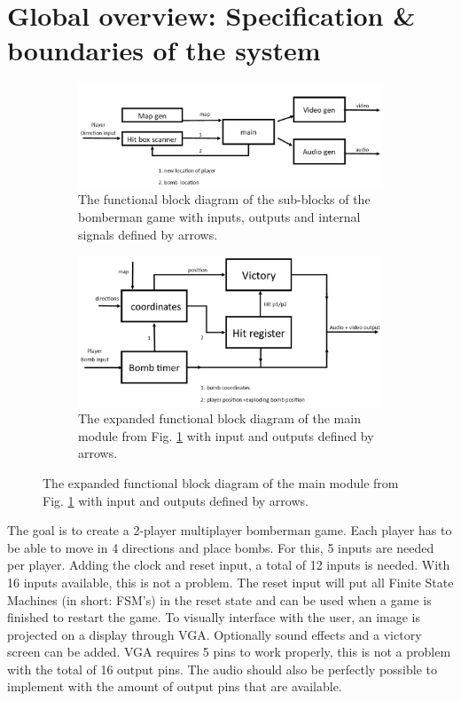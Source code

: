 \section{Global overview: Specification \& boundaries of the system}
\begin{figure}[H]
\begin{subfigure}{.5\textwidth}
    \centering
    \includegraphics[width=1\linewidth]{Figures/function_block_diagram.jpg}
    \caption{The functional block diagram of the sub-blocks of the bomberman game with inputs, outputs and internal signals defined by arrows.}
    \label{fig:blockdiagram}
    \end{subfigure}%
    \begin{subfigure}{.5\textwidth}
    \centering
    \includegraphics[width=1\linewidth]{Figures/main_block.jpg}
    \caption{The expanded functional block diagram of the main module from Fig. \ref{fig:blockdiagram} with input and outputs defined by arrows.}
    \label{fig:mainblockdiagram}
\end{subfigure}
\end{figure}

The goal is to create a 2-player multiplayer bomberman game. Each player has to be able to move in 4 directions and place bombs. For this, 5 inputs are needed per player. Adding the clock and reset input, a total of 12 inputs is needed. With 16 inputs available, this is not a problem. The reset input will put all Finite State Machines (in short: FSM's) in the reset state and can be used when a game is finished to restart the game. To visually interface with the user, an image is projected on a display through VGA. Optionally sound effects and a victory screen can be added. VGA requires 5 pins to work properly, this is not a problem with the total of 16 output pins. The audio should also be perfectly possible to implement with the amount of output pins that are available.\\

